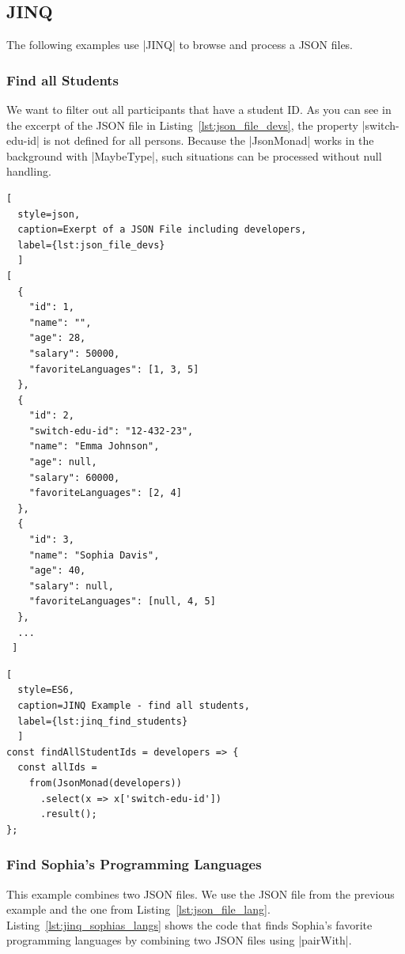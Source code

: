 \subsection{JINQ}
\label{sub:results JINQ}
The following examples use |JINQ| to browse and process a JSON files.

\subsubsection{Find all Students}
\label{subsub:Find all Students}
We want to filter out all participants that have
a student ID. As you can see in the excerpt of the JSON file in
Listing~\ref{lst:json_file_devs}, the property |switch-edu-id| is
not defined for all persons. Because the |JsonMonad| works in the background with
|MaybeType|, such situations can be processed without null handling.

\begin{lstlisting}[
  style=json, 
  caption=Exerpt of a JSON File including developers,
  label={lst:json_file_devs}
  ]
[
  {
    "id": 1,
    "name": "",
    "age": 28,
    "salary": 50000,
    "favoriteLanguages": [1, 3, 5]
  },
  {
    "id": 2,
    "switch-edu-id": "12-432-23",
    "name": "Emma Johnson",
    "age": null,
    "salary": 60000,
    "favoriteLanguages": [2, 4]
  },
  {
    "id": 3,
    "name": "Sophia Davis",
    "age": 40,
    "salary": null,
    "favoriteLanguages": [null, 4, 5]
  },
  ...
 ]
\end{lstlisting}


\begin{lstlisting}[
  style=ES6, 
  caption=JINQ Example - find all students,
  label={lst:jinq_find_students}
  ]
const findAllStudentIds = developers => {
  const allIds =
    from(JsonMonad(developers))
      .select(x => x['switch-edu-id'])
      .result();
};
\end{lstlisting}

\subsubsection{Find Sophia's Programming Languages}
\label{subsub:Find Sophia's Programming Languages}

This example combines two JSON files. We use the JSON file from the previous
example and the one from Listing~\ref{lst:json_file_lang}.
Listing~\ref{lst:jinq_sophias_langs} shows the code that finds Sophia's 
favorite programming languages by combining two JSON files using |pairWith|. 

